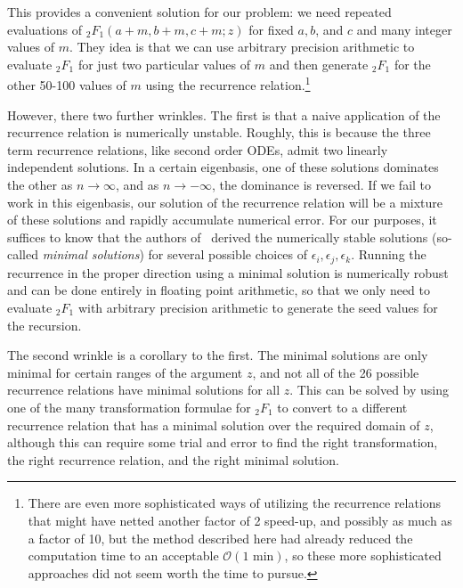 \documentclass[12pt]{article}%
\begin{document}
This provides a convenient solution for our problem: we need repeated
evaluations of ${_2F_1}(a+m, b+m, c+m; z)$
for fixed $a,b$, and $c$ and many integer values of $m$.
They idea is that we can use arbitrary precision arithmetic to evaluate
${_2F_1}$ for just two particular values of $m$ and then generate
${_2F_1}$ for the other 50-100 values of $m$ using the recurrence
relation.\footnote{
There are even more sophisticated ways of utilizing the recurrence
relations that might have netted another factor of 2 speed-up, and
possibly as much as a factor of 10, but the method described here had
already reduced the computation time to an acceptable
$\mathcal{O}(\text{1 min})$, so these more sophisticated approaches did
not seem worth the time to pursue.
}

However, there two further wrinkles.
The first is that
a naive application of the recurrence relation is numerically unstable.
Roughly, this is because the three term recurrence relations,
like second order ODEs, admit two linearly independent solutions.
In a certain eigenbasis, one of these solutions dominates the other
as $n\rightarrow\infty$, and as $n\rightarrow-\infty$,
the dominance is reversed.
If we fail to work in this eigenbasis, our solution of the recurrence relation
will be a mixture of these solutions and rapidly accumulate numerical error.
For our purposes, it suffices to know that the authors of~\cite{Gil2007}
derived the numerically stable solutions (so-called \textit{minimal solutions})
for several possible choices of $\epsilon_i, \epsilon_j, \epsilon_k$.
Running the recurrence in the proper direction using a minimal solution
is numerically robust and can be done entirely in floating point arithmetic, 
so that we only need to evaluate ${_2F_1}$ with arbitrary precision arithmetic
to generate the seed values for the recursion.

The second wrinkle is a corollary to the first.
The minimal solutions are only minimal for certain ranges of the argument $z$,
and not all of the 26 possible recurrence relations
have minimal solutions for all $z$.
This can be solved by using one of the many transformation formulae for
${_2F_1}$ to convert to a different recurrence relation that has
a minimal solution over the required domain of $z$, although
this can require some trial and error to find the right transformation,
the right recurrence relation, and the right minimal solution.
\end{document}
